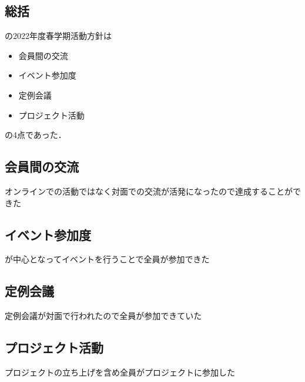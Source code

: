 \subsection*{\secondGrade{}総括}


\secondGrade{}の2022年度春学期活動方針は
\begin{itemize}
    \item 会員間の交流
    \item イベント参加度
    \item 定例会議
    \item プロジェクト活動
\end{itemize}
の4点であった．

\subsection*{会員間の交流}
オンラインでの活動ではなく対面での交流が活発になったので達成することができた

\subsection*{イベント参加度}
\secondGrade{}が中心となってイベントを行うことで全員が参加できた

\subsection*{定例会議}
定例会議が対面で行われたので全員が参加できていた

\subsection*{プロジェクト活動}
プロジェクトの立ち上げを含め全員がプロジェクトに参加した
